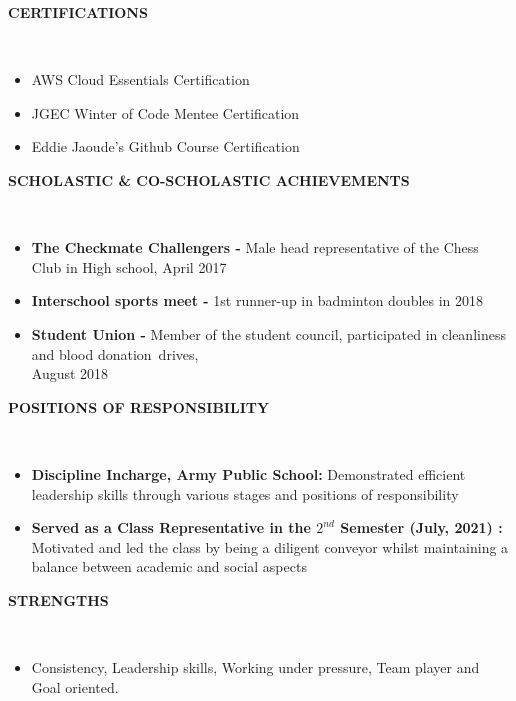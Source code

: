 \documentclass[a4paper,10pt]{article}
\newcommand{\lsep}{-0.5cm}
\newcommand{\resheading}[1]{{\small \colorbox{mygrey}{\begin{minipage}{0.975\textwidth}{\textbf{#1 \vphantom{p\^{E}}}}\end{minipage}}}}
\begin{document}
\resheading{\textbf{CERTIFICATIONS} }\\[\lsep]
\begin{itemize}
\setlength\itemsep{0em}
\item \noindent AWS Cloud Essentials Certification
\item \noindent JGEC Winter of Code Mentee Certification
\item \noindent Eddie Jaoude's Github Course Certification
\\
\end{itemize}


\resheading{\textbf{SCHOLASTIC \& CO-SCHOLASTIC ACHIEVEMENTS} }\\[\lsep]
\begin{itemize}
\setlength\itemsep{0em}
\item \noindent \textbf{The Checkmate Challengers - }Male head representative of the Chess Club in High school, April 2017
\item \noindent\textbf{Interschool sports meet - }1st runner-up in badminton doubles in 2018
\item \noindent\textbf{Student Union - }Member of the student council, participated in cleanliness and blood donation drives, \\ August 2018

\end{itemize}

\resheading{\textbf{POSITIONS OF RESPONSIBILITY} }\\[\lsep]
\begin{itemize}
\setlength\itemsep{0em}
\item \noindent \textbf{Discipline Incharge, Army Public School:} Demonstrated efficient leadership skills through various stages and positions of responsibility
\item \noindent \textbf{Served as a Class Representative in the ${2^{nd}}$ Semester (July, 2021) :}  Motivated and led the class by being a diligent conveyor whilst maintaining a balance between academic and social aspects

\end{itemize}

\resheading{\textbf{STRENGTHS} }\\[\lsep]
\begin{itemize}
\setlength\itemsep{0em}
\item  Consistency, Leadership skills, Working under pressure, Team player and Goal oriented.

\end{itemize}
\end{document}
